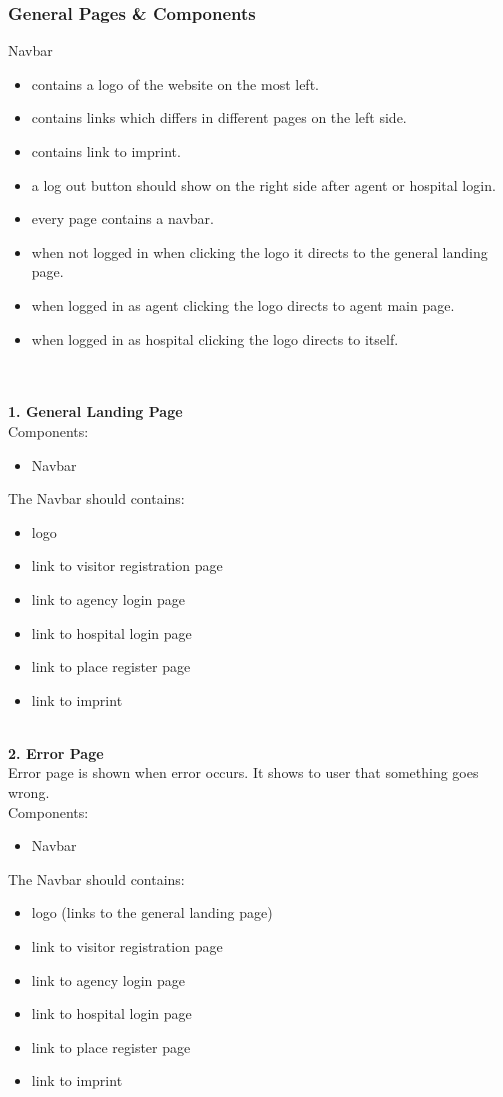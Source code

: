 \documentclass{article}
\begin{document}
\subsubsection*{General Pages \& Components}
Navbar
\begin{itemize}
	\item contains a logo of the website on the most left.
  	\item contains links which differs in different pages on the left side.
  	\item contains link to imprint.
  	\item a log out button should show on the right side after agent or hospital login.
  	\item every page contains a navbar.
  	\item when not logged in when clicking the logo it directs to the general landing page.
	\item when logged in as agent clicking the logo directs to agent main page.
	\item when logged in as hospital clicking the logo directs to itself.
\end{itemize}
\\ 
\\ 
\textbf{1. General Landing Page}\\
Components:
\begin{itemize}
	\item Navbar
\end{itemize}
The Navbar should contains:
\begin{itemize}
	\item logo
	\item link to visitor registration page
	\item link to agency login page
	\item link to hospital login page
	\item link to place register page
	\item link to imprint
\end{itemize}
\\
\textbf{2. Error Page}\\
Error page is shown when error occurs. It shows to user that something goes wrong.\\
Components:
\begin{itemize}
	\item Navbar
\end{itemize}
The Navbar should contains:
\begin{itemize}
	\item logo (links to the general landing page)
	\item link to visitor registration page
	\item link to agency login page
	\item link to hospital login page
	\item link to place register page
	\item link to imprint
\end{itemize}
\end{document}
